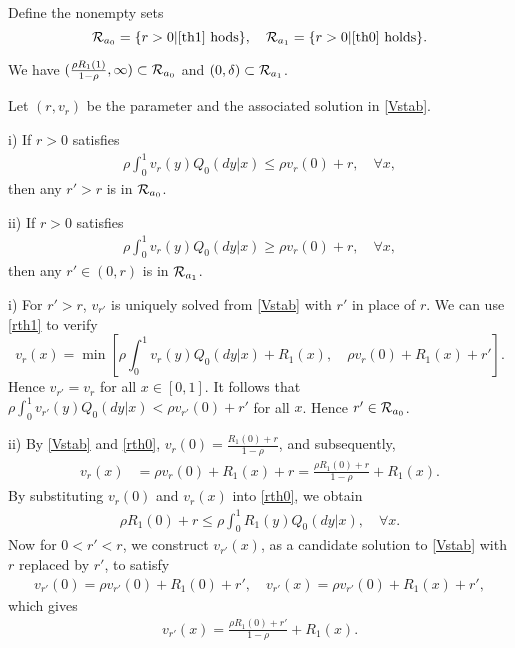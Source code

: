 \documentclass[graybox]{svmult}
\begin{document}
Define the nonempty sets
$$
{\cal R}_{a_0}=\{r>0| \eqref{th1} \mbox{ hods}\}, \quad {\cal R}_{a_1}=\{r>0|  \eqref{th0} \mbox{ holds}\}  .
$$

\begin{remark}\label{reC:int}
We have $(\frac{\rho R_1(1)}{1-\rho }, \infty   )\subset {\cal R}_{a_0} $ and  $(0, \delta)\subset {\cal R}_{a_1} $.
\end{remark}


\begin{lemma} \label{lemma:connect}
 Let $(r, v_r)$ be the parameter and the associated solution in \eqref{Vstab}.

i) If $r>0$ satisfies
\begin{align}
\rho \int_0^1 v_r(y) Q_0(dy|x) \le \rho v_r(0) +r, \quad \forall x,
\label{rth1}
\end{align}
  then  any $r'>r$ is in ${\cal R}_{a_0}$.

ii) If $r>0$ satisfies
\begin{align}
\rho \int_0^1 v_r(y) Q_0(dy|x) \ge \rho v_r(0) +r,\quad \forall x,
\label{rth0}
\end{align}
then any  $r'\in (0,r)$ is in ${\cal R}_{a_1}$.
\end{lemma}




\proof i) For $r'>r$, $v_{r'}$ is uniquely solved from \eqref{Vstab} with $r'$ in place of $r$. We can use \eqref{rth1} to  verify
$$
v_r(x)= \min \left[\rho \int_0^1 v_r(y) Q_0(dy|x) +R_1(x) , \quad \rho v_r(0) +R_1(x)+r'\right].
$$
Hence $v_{r'}=v_r$ for all $x\in [0,1]$. It follows that
$\rho \int_0^1 v_{r'}(y) Q_0(dy|x) <  \rho v_{r'}(0)+r'$ for all $x$. Hence  $r'\in {\cal R}_{a_0}$.

ii) By \eqref{Vstab} and  \eqref{rth0},
 $v_r(0) = \frac{ R_1(0)+r}{1-\rho } $,  %
 and subsequently,
\begin{align*}
 v_r(x) &= \rho v_r(0) +R_1(x) +r
     = \frac{\rho R_1(0)+r}{1-\rho }  +R_1(x).  %
\end{align*}
By substituting $v_r(0)$ and $v_r(x)$ into \eqref{rth0}, we obtain
\begin{align}
\rho R_1(0) +r \le \rho \int_0^1 R_1(y) Q_0(dy|x), \quad \forall x.
\label{rhorrle}
\end{align}
Now for $0<r'<r$, we construct $v_{r'}(x)$, as a candidate solution to
\eqref{Vstab} with $r$ replaced by $r'$,    to satisfy
\begin{align}
v_{r'}(0)= \rho v_{r'}(0)+R_1(0)+r', \quad
v_{r'}(x) = \rho v_{r'}(0) +R_1(x) +r', \label{defvp}
\end{align}
which gives
\begin{align}
v_{r'}(x) =\frac{\rho R_1(0)+r'  }{1-\rho }  +R_1(x).
\label{ss}
\end{align}
\end{document}
